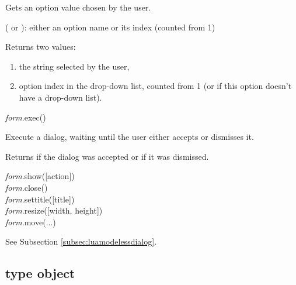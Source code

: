 \documentclass[a4paper,12pt,twoside,extrafontsizes]{memoir}
\begin{document}
\begin{funcdescr}
	Gets an option value chosen by the user.
\end{funcdescr}

\begin{funcparams}
	 ( or ): either an option name or its index (counted from 1)
\end{funcparams}

\begin{funcret}
	Returns two values:
	\begin{enumerate}
		\item the string selected by the user,
		\item option index in the drop-down list, counted from 1 (or  if this option doesn't have a drop-down list).
	\end{enumerate}
\end{funcret}


\begin{luafuncprototype}
\emph{form}.exec()
\end{luafuncprototype}

\begin{funcdescr}
	Execute a dialog, waiting until the user either accepts or dismisses it.
\end{funcdescr}

\begin{funcret}
	Returns  if the dialog was accepted or  if it was dismissed.
\end{funcret}


\begin{luafuncprototype}
\emph{form}.show([action]) \\
\emph{form}.close() \\
\emph{form}.settitle([title]) \\
\emph{form}.resize([width, height]) \\
\emph{form}.move(...)
\end{luafuncprototype}

\begin{funcdescr}
	See Subsection \ref{subsec:luamodelessdialog}.
\end{funcdescr}

\subsection{ type object}
\label{subsec:textviewer}
\end{document}
